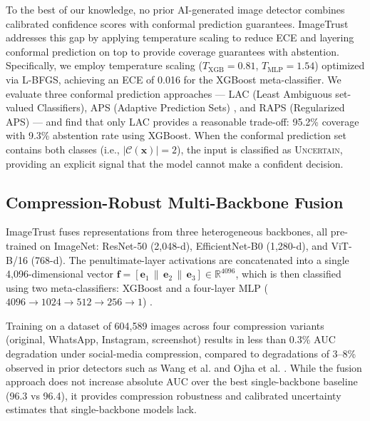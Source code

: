 \documentclass[12pt,a4paper]{book}
\theoremstyle{definition}
\theoremstyle{remark}
\begin{document}
To the best of our knowledge, no prior AI-generated image detector combines calibrated confidence scores with conformal prediction guarantees. ImageTrust addresses this gap by applying temperature scaling to reduce ECE and layering conformal prediction on top to provide coverage guarantees with abstention. Specifically, we employ temperature scaling ($T_{\text{XGB}} = 0.81$, $T_{\text{MLP}} = 1.54$) optimized via L-BFGS, achieving an ECE of 0.016 for the XGBoost meta-classifier. We evaluate three conformal prediction approaches --- LAC (Least Ambiguous set-valued Classifiers), APS (Adaptive Prediction Sets) \cite{romano2020classification}, and RAPS (Regularized APS) \cite{angelopoulos2021uncertainty} --- and find that only LAC provides a reasonable trade-off: 95.2\% coverage with 9.3\% abstention rate using XGBoost. When the conformal prediction set contains both classes (i.e., $|\mathcal{C}(\mathbf{x})| = 2$), the input is classified as \textsc{Uncertain}, providing an explicit signal that the model cannot make a confident decision.


\subsection{Compression-Robust Multi-Backbone Fusion}\label{sec:contrib-fusion}

ImageTrust fuses representations from three heterogeneous backbones, all pre-trained on ImageNet: ResNet-50 \cite{he2016deep} (2,048-d), EfficientNet-B0 \cite{tan2019efficientnet} (1,280-d), and ViT-B/16 \cite{dosovitskiy2021image} (768-d). The penultimate-layer activations are concatenated into a single 4,096-dimensional vector $\mathbf{f} = [\mathbf{e}_1 \,\|\, \mathbf{e}_2 \,\|\, \mathbf{e}_3] \in \mathbb{R}^{4096}$, which is then classified using two meta-classifiers: XGBoost \cite{chen2016xgboost} and a four-layer MLP ($4096 \to 1024 \to 512 \to 256 \to 1$) \cite{rumelhart1986learning}.

Training on a dataset of 604,589 images across four compression variants (original, WhatsApp, Instagram, screenshot) results in less than 0.3\% AUC degradation under social-media compression, compared to degradations of 3--8\% observed in prior detectors such as Wang et al. \cite{wang2020cnn} and Ojha et al. \cite{ojha2023towards}. While the fusion approach does not increase absolute AUC over the best single-backbone baseline (96.3 vs 96.4), it provides compression robustness and calibrated uncertainty estimates that single-backbone models lack.
\end{document}

